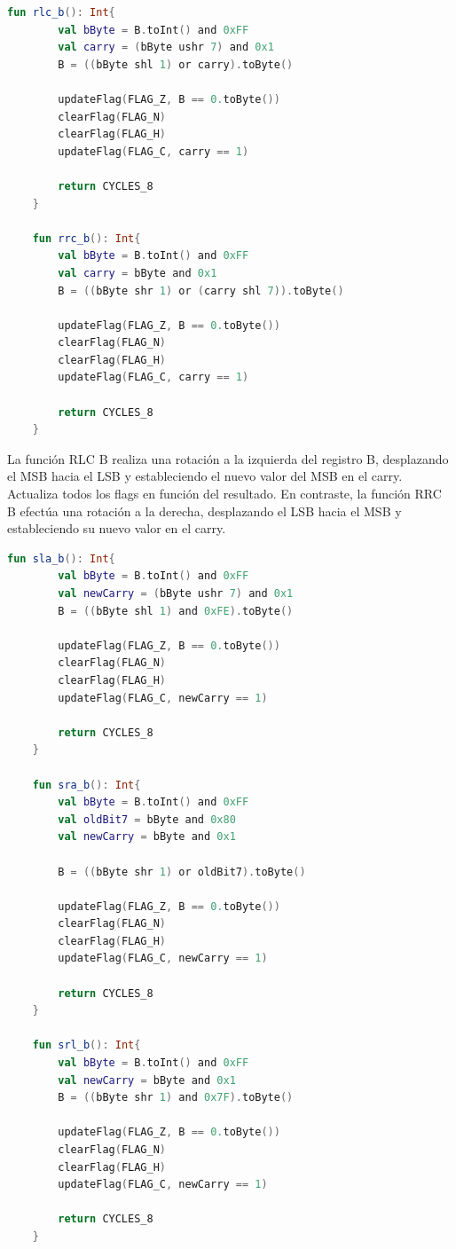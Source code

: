 \begin{lstlisting}[language=Kotlin, caption={Operaciones RLC y RRC}, label={code:kotlinrlcrrc}]
    fun rlc_b(): Int{
        val bByte = B.toInt() and 0xFF
        val carry = (bByte ushr 7) and 0x1
        B = ((bByte shl 1) or carry).toByte()

        updateFlag(FLAG_Z, B == 0.toByte())
        clearFlag(FLAG_N)
        clearFlag(FLAG_H)
        updateFlag(FLAG_C, carry == 1)

        return CYCLES_8
    }

    fun rrc_b(): Int{
        val bByte = B.toInt() and 0xFF
        val carry = bByte and 0x1
        B = ((bByte shr 1) or (carry shl 7)).toByte()

        updateFlag(FLAG_Z, B == 0.toByte())
        clearFlag(FLAG_N)
        clearFlag(FLAG_H)
        updateFlag(FLAG_C, carry == 1)

        return CYCLES_8
    }
\end{lstlisting}

La función RLC B realiza una rotación a la izquierda del registro B, desplazando el MSB hacia el LSB y estableciendo el nuevo valor del MSB en el carry. Actualiza todos los flags en función del resultado. En contraste, la función RRC B efectúa una rotación a la derecha, desplazando el LSB hacia el MSB y estableciendo su nuevo valor en el carry.

\begin{lstlisting}[language=Kotlin, caption={Operaciones SLA, SRA y SRL}, label={code:kotlinslasrasrl}]
    fun sla_b(): Int{
        val bByte = B.toInt() and 0xFF
        val newCarry = (bByte ushr 7) and 0x1
        B = ((bByte shl 1) and 0xFE).toByte()

        updateFlag(FLAG_Z, B == 0.toByte())
        clearFlag(FLAG_N)
        clearFlag(FLAG_H)
        updateFlag(FLAG_C, newCarry == 1)
        
        return CYCLES_8
    }

    fun sra_b(): Int{
        val bByte = B.toInt() and 0xFF
        val oldBit7 = bByte and 0x80
        val newCarry = bByte and 0x1

        B = ((bByte shr 1) or oldBit7).toByte()

        updateFlag(FLAG_Z, B == 0.toByte())
        clearFlag(FLAG_N)
        clearFlag(FLAG_H)
        updateFlag(FLAG_C, newCarry == 1)

        return CYCLES_8
    }

    fun srl_b(): Int{
        val bByte = B.toInt() and 0xFF
        val newCarry = bByte and 0x1
        B = ((bByte shr 1) and 0x7F).toByte()

        updateFlag(FLAG_Z, B == 0.toByte())
        clearFlag(FLAG_N)
        clearFlag(FLAG_H)
        updateFlag(FLAG_C, newCarry == 1)

        return CYCLES_8
    }
\end{lstlisting}

